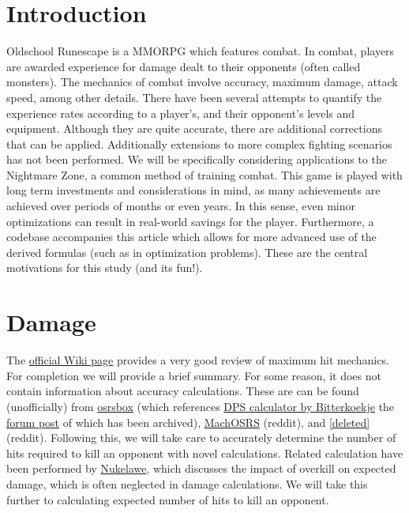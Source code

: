 \documentclass[../../main.tex]{subfiles}
\begin{document}
	\section{Introduction}
		Oldschool Runescape is a MMORPG which features combat. In combat, players are awarded experience for damage dealt to their opponents (often called monsters). The mechanics of combat involve accuracy, maximum damage, attack speed, among other details. There have been several attempts to quantify the experience rates according to a player's, and their opponent's levels and equipment. Although they are quite accurate, there are additional corrections that can be applied. Additionally extensions to more complex fighting scenarios has not been performed. We will be specifically considering applications to the Nightmare Zone, a common method of training combat. This game is played with long term investments and considerations in mind, as many achievements are achieved over periods of months or even years. In this sense, even minor optimizations can result in real-world savings for the player. Furthermore, a codebase accompanies this article which allows for more advanced use of the derived formulas (such as in optimization problems). These are the central motivations for this study (and its fun!).

	\section{Damage}
		The \href{https://oldschool.runescape.wiki/w/Maximum_hit}{official Wiki page} provides a very good review of maximum hit mechanics. For completion we will provide a brief summary. For some reason, it does not contain information about accuracy calculations. These are can be found (unofficially) from \href{https://www.osrsbox.com/blog/2019/01/22/calculating-melee-dps-in-osrs/}{osrsbox} (which references \href{https://docs.google.com/spreadsheets/d/1wzy1VxNWEAAc0FQyDAdpiFggAfn5U6RGPp2CisAHZW8/edit#gid=158500257}{DPS calculator by Bitterkoekje} the \href{https://web.archive.org/web/20190905124128/http://webcache.googleusercontent.com/search?q=cache:http://services.runescape.com/m=forum/forums.ws?317,318,712,65587452}{forum post} of which has been archived), \href{https://www.reddit.com/r/2007scape/comments/40bvk6/accuracy_and_exphr_combat_formula/}{MachOSRS} (reddit), and \href{https://www.reddit.com/r/2007scape/comments/5lrty0/math_inside_corrected_accuracy_formula/}{[deleted]} (reddit).  Following this, we will take care to accurately determine the number of hits required to kill an opponent with novel calculations. Related calculation have been performed by \href{https://www.reddit.com/r/2007scape/comments/4d6l7j/effects_of_overkill_on_dps/}{Nukelawe}, which discusses the impact of overkill on expected damage, which is often neglected in damage calculations. We will take this further to calculating expected number of hits to kill an opponent.
\end{document}
